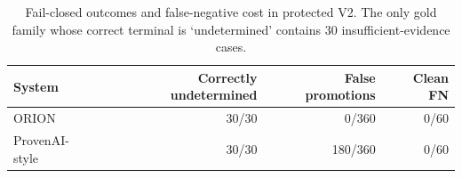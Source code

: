 \begin{table}[t]
\centering\small
\caption{Fail-closed outcomes and false-negative cost in protected V2. The only gold family whose correct terminal is `undetermined' contains 30 insufficient-evidence cases.}\label{tab:p4_t3}
\begin{tabular}{lrrr}\toprule
System & Correctly undetermined & False promotions & Clean FN \\ \midrule
ORION & 30/30 & 0/360 & 0/60 \\
ProvenAI-style & 30/30 & 180/360 & 0/60 \\
\bottomrule\end{tabular}\end{table}
